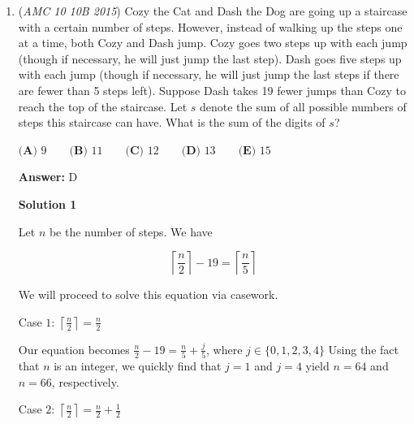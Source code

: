 \begin{enumerate}
From the 2006 AMC 10A Problem 25, they look for more or less the same answer except the question asks for the probability that the bug will visit the 7 remaining corners exactly once after 7 moves. From each vertex of the cube, there are 3 edges emanating from it, meaning that there are a total of 3 * the number of ways the bug can visit the 7 vertices exactly once from a fixed point (we have to divide 3, though, because the question asks for the total number of PATHS — each of the 3 vertices emanating from a given vertex offers the same number of distinct paths). Since the answer to the 2006 AMC 10A problem 25 is 18 total ways, then the answer to this question is $18/3=\boxed{\textbf{(A)}\; 6}$ ways.

 


	\item (\textit{AMC 10 10B 2015}) Cozy the Cat and Dash the Dog are going up a staircase with a certain number of steps. However, instead of walking up the steps one at a time, both Cozy and Dash jump. Cozy goes two steps up with each jump (though if necessary, he will just jump the last step). Dash goes five steps up with each jump (though if necessary, he will just jump the last steps if there are fewer than 5 steps left). Suppose Dash takes 19 fewer jumps than Cozy to reach the top of the staircase. Let $s$ denote the sum of all possible numbers of steps this staircase can have. What is the sum of the digits of $s$?


 $\textbf{(A) } 9 \qquad\textbf{(B) } 11 \qquad\textbf{(C) } 12 \qquad\textbf{(D) } 13 \qquad\textbf{(E) } 15$

 \textbf{Answer: }D



\textbf{Solution 1}

Let $n$ be the number of steps. We have

 
 \[\left\lceil \frac{n}{2} \right\rceil - 19 = \left\lceil \frac{n}{5} \right\rceil\]

 We will proceed to solve this equation via casework.

 Case $1$: $\left\lceil \frac{n}{2} \right\rceil = \frac{n}{2}$

 Our equation becomes $\frac{n}{2} - 19 = \frac{n}{5} + \frac{j}{5}$, where $j \in \{0,1,2,3,4\}$ Using the fact that $n$ is an integer, we quickly find that $j=1$ and $j=4$ yield $n=64$ and $n=66$, respectively.

 


 Case $2$: $\left\lceil \frac{n}{2} \right\rceil = \frac{n}{2}+\frac{1}{2}$


\end{enumerate}
